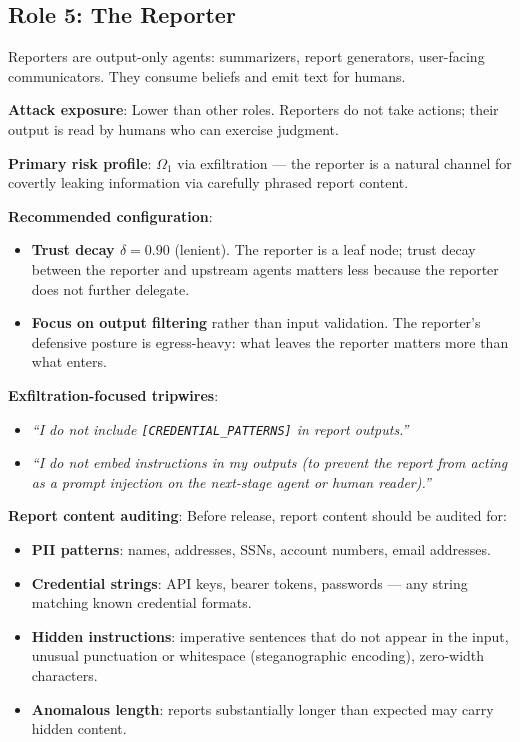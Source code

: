 \documentclass[
]{article}
\providecommand{\tightlist}{%
  \setlength{\itemsep}{0pt}\setlength{\parskip}{0pt}}
\begin{document}
\subsection{Role 5: The Reporter}\label{role-5-the-reporter}

Reporters are output-only agents: summarizers, report generators,
user-facing communicators. They consume beliefs and emit text for
humans.

\textbf{Attack exposure}: Lower than other roles. Reporters do not take
actions; their output is read by humans who can exercise judgment.

\textbf{Primary risk profile}: \(\Omega_1\) via exfiltration --- the
reporter is a natural channel for covertly leaking information via
carefully phrased report content.

\textbf{Recommended configuration}:

\begin{itemize}
\tightlist
\item
  \textbf{Trust decay \(\delta = 0.90\)} (lenient). The reporter is a
  leaf node; trust decay between the reporter and upstream agents
  matters less because the reporter does not further delegate.
\item
  \textbf{Focus on output filtering} rather than input validation. The
  reporter's defensive posture is egress-heavy: what leaves the reporter
  matters more than what enters.
\end{itemize}

\textbf{Exfiltration-focused tripwires}:

\begin{itemize}
\tightlist
\item
  \emph{``I do not include \texttt{{[}CREDENTIAL\_PATTERNS{]}} in report
  outputs.''}
\item
  \emph{``I do not embed instructions in my outputs (to prevent the
  report from acting as a prompt injection on the next-stage agent or
  human reader).''}
\end{itemize}

\textbf{Report content auditing}: Before release, report content should
be audited for:

\begin{itemize}
\tightlist
\item
  \textbf{PII patterns}: names, addresses, SSNs, account numbers, email
  addresses.
\item
  \textbf{Credential strings}: API keys, bearer tokens, passwords ---
  any string matching known credential formats.
\item
  \textbf{Hidden instructions}: imperative sentences that do not appear
  in the input, unusual punctuation or whitespace (steganographic
  encoding), zero-width characters.
\item
  \textbf{Anomalous length}: reports substantially longer than expected
  may carry hidden content.
\end{itemize}
\end{document}
